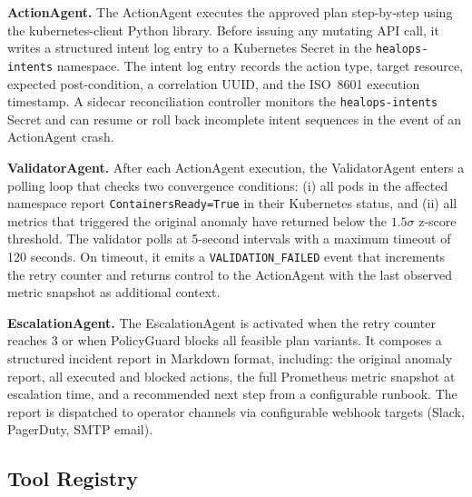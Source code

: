 \documentclass[journal,10pt,twoside]{IEEEtran}
\begin{document}
\textbf{ActionAgent.}
The ActionAgent executes the approved plan step-by-step using the
kubernetes-client Python library. Before issuing any mutating API call,
it writes a structured intent log entry to a Kubernetes Secret in the
\texttt{healops-intents} namespace. The intent log entry records the
action type, target resource, expected post-condition, a correlation UUID,
and the ISO~8601 execution timestamp. A sidecar reconciliation controller
monitors the \texttt{healops-intents} Secret and can resume or roll back
incomplete intent sequences in the event of an ActionAgent crash.

\textbf{ValidatorAgent.}
After each ActionAgent execution, the ValidatorAgent enters a polling
loop that checks two convergence conditions: (i) all pods in the affected
namespace report \texttt{ContainersReady=True} in their Kubernetes status,
and (ii) all metrics that triggered the original anomaly have returned
below the $1.5\sigma$ z-score threshold. The validator polls at 5-second
intervals with a maximum timeout of 120 seconds. On timeout, it emits a
\texttt{VALIDATION\_FAILED} event that increments the retry counter and
returns control to the ActionAgent with the last observed metric snapshot
as additional context.

\textbf{EscalationAgent.}
The EscalationAgent is activated when the retry counter reaches 3 or when
PolicyGuard blocks all feasible plan variants. It composes a structured
incident report in Markdown format, including: the original anomaly
report, all executed and blocked actions, the full Prometheus metric
snapshot at escalation time, and a recommended next step from a
configurable runbook. The report is dispatched to operator channels via
configurable webhook targets (Slack, PagerDuty, SMTP email).

\subsection{Tool Registry}
\end{document}
